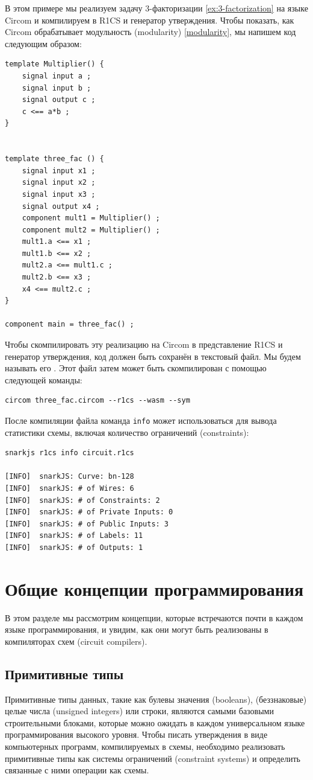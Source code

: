 \begin{example}
\label{ex:3-fac-circom}
В этом примере мы реализуем задачу 3-факторизации \ref{ex:3-factorization} на языке Circom и компилируем в R1CS и генератор утверждения. Чтобы показать, как Circom обрабатывает модульность (modularity) \ref{modularity}, мы напишем код следующим образом:
\begin{lstlisting}
template Multiplier() {
    signal input a ;
    signal input b ;
    signal output c ;
    c <== a*b ;
}


template three_fac () {
    signal input x1 ;
    signal input x2 ;
    signal input x3 ;
    signal output x4 ;
    component mult1 = Multiplier() ;
    component mult2 = Multiplier() ;
    mult1.a <== x1 ;
    mult1.b <== x2 ;
    mult2.a <== mult1.c ;
    mult2.b <== x3 ;
    x4 <== mult2.c ;
}

component main = three_fac() ;
\end{lstlisting}
Чтобы скомпилировать эту реализацию на Circom в представление R1CS и генератор утверждения, код должен быть сохранён в текстовый файл. Мы будем называть его . Этот файл затем может быть скомпилирован с помощью следующей команды:
\begin{lstlisting}
circom three_fac.circom --r1cs --wasm --sym
\end{lstlisting}
После компиляции файла команда \texttt{info} может использоваться для вывода статистики схемы, включая количество ограничений (constraints):
\begin{lstlisting}
snarkjs r1cs info circuit.r1cs

[INFO]  snarkJS: Curve: bn-128
[INFO]  snarkJS: # of Wires: 6
[INFO]  snarkJS: # of Constraints: 2
[INFO]  snarkJS: # of Private Inputs: 0
[INFO]  snarkJS: # of Public Inputs: 3
[INFO]  snarkJS: # of Labels: 11
[INFO]  snarkJS: # of Outputs: 1
\end{lstlisting}
\end{example}

\section{Общие концепции программирования}
В этом разделе мы рассмотрим концепции, которые встречаются почти в каждом языке программирования, и увидим, как они могут быть реализованы в компиляторах схем (circuit compilers).
\subsection{Примитивные типы}
Примитивные типы данных, такие как булевы значения (booleans), (беззнаковые) целые числа (unsigned integers) или строки, являются самыми базовыми строительными блоками, которые можно ожидать в каждом универсальном языке программирования высокого уровня. Чтобы писать утверждения в виде компьютерных программ, компилируемых в схемы, необходимо реализовать примитивные типы как системы ограничений (constraint systems) и определить связанные с ними операции как схемы.

